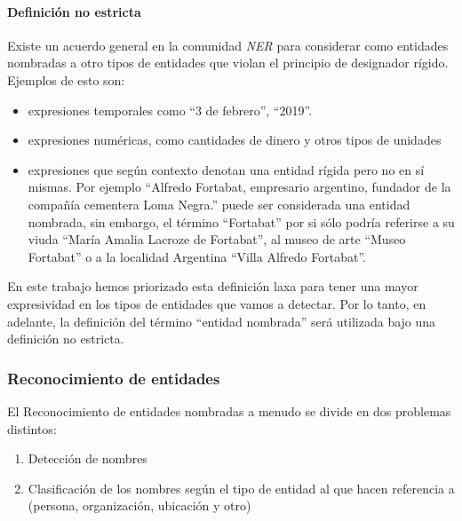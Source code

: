 \documentclass[12pt,a4paper,]{scrartcl}
\providecommand{\tightlist}{%
  \setlength{\itemsep}{0pt}\setlength{\parskip}{0pt}}
\let\oldparagraph\paragraph
\renewcommand{\paragraph}[1]{\oldparagraph{#1}\mbox{}}
\begin{document}
\hypertarget{definiciuxf3n-no-estricta}{%
\paragraph{Definición no estricta}\label{definiciuxf3n-no-estricta}}

Existe un acuerdo general en la comunidad \emph{NER} para considerar como entidades nombradas a otro tipos de entidades que violan el principio de designador rígido. Ejemplos de esto son:

\begin{itemize}
\tightlist
\item
  expresiones temporales como \enquote{3 de febrero}, \enquote{2019}.
\item
  expresiones numéricas, como cantidades de dinero y otros tipos de unidades
\item
  expresiones que según contexto denotan una entidad rígida pero no en sí mismas. Por ejemplo \enquote{Alfredo Fortabat, empresario argentino, fundador de la compañía cementera Loma Negra.} puede ser considerada una entidad nombrada, sin embargo, el término \enquote{Fortabat} por si sólo podría referirse a su viuda \enquote{María Amalia Lacroze de Fortabat}, al museo de arte \enquote{Museo Fortabat} o a la localidad Argentina \enquote{Villa Alfredo Fortabat}.
\end{itemize}

En este trabajo hemos priorizado esta definición laxa para tener una mayor expresividad en los tipos de entidades que vamos a detectar. Por lo tanto, en adelante, la definición del término \enquote{entidad nombrada} será utilizada bajo una definición no estricta.

\hypertarget{reconocimiento-de-entidades}{%
\subsubsection{Reconocimiento de entidades}\label{reconocimiento-de-entidades}}

El Reconocimiento de entidades nombradas a menudo se divide en dos problemas distintos:

\begin{enumerate}
\def\labelenumi{\arabic{enumi}.}
\tightlist
\item
  Detección de nombres
\item
  Clasificación de los nombres según el tipo de entidad al que hacen referencia a (persona, organización, ubicación y otro)
\end{enumerate}
\end{document}
